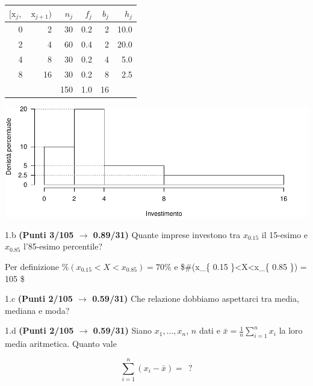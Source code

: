 \documentclass[
  11pt,
]{book}
\theoremstyle{mytheoremstyle}
\theoremstyle{mydefstyle}
\newenvironment{sol}
  {
  \begin{tcolorbox}[enhanced,breakable,arc=0.1mm,boxrule=1pt,colback=white,colframe=iblue,
  title=\bf \fontfamily{lmss}\selectfont \hspace{.5 cm} Soluzione,drop fuzzy shadow]

}{
\end{tcolorbox}
  }
\begin{document}
\begin{sol}

\begin{table}[H]
\centering
\begin{tabular}{rrrrrr}
\toprule
$[\text{x}_j,$ & $\text{x}_{j+1})$ & $n_j$ & $f_j$ & $b_j$ & $h_j$\\
\midrule
0 & 2 & 30 & 0.2 & 2 & 10.0\\
2 & 4 & 60 & 0.4 & 2 & 20.0\\
4 & 8 & 30 & 0.2 & 4 & 5.0\\
8 & 16 & 30 & 0.2 & 8 & 2.5\\
 &  & 150 & 1.0 & 16 & \\
\bottomrule
\end{tabular}
\end{table}

\begin{center}\includegraphics{Esami_passati_con_soluzioni_files/figure-latex/2024-106-1} \end{center}

\end{sol}

1.b \textbf{(Punti 3/105 \(\rightarrow\) 0.89/31)} Quante imprese investono tra \(x_{0.15}\) il 15-esimo e \(x_{0.85}\) l'85-esimo percentile?

\begin{sol}
Per definizione \(\%(x_{ 0.15 }<X<x_{ 0.85 })= 70 \%\) e
\$\#(x\_\{ 0.15 \}\textless X\textless x\_\{ 0.85 \})  = 105 \$

\end{sol}

1.c \textbf{(Punti 2/105 \(\rightarrow\) 0.59/31)} Che relazione dobbiamo aspettarci tra media, mediana e moda?

1.d \textbf{(Punti 2/105 \(\rightarrow\) 0.59/31)} Siano \(x_1,...,x_n\), \(n\) dati e \(\bar x=\frac 1n \sum_{i=1}^n x_i\) la loro media aritmetica. Quanto vale

\[
\sum_{i=1}^n (x_i-\bar x)=~~?
\]
\end{document}
